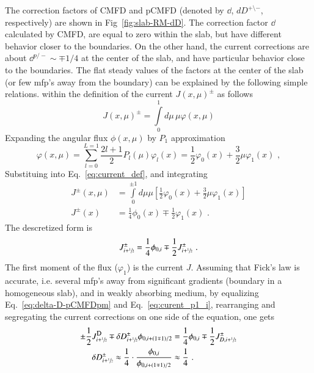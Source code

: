 The correction factors of CMFD and pCMFD (denoted by $\dd$, $dD^{+\setminus -}$, respectively) are shown in Fig~\ref{fig:slab-RM-dD}. The correction factor $\dd$ calculated by CMFD, are equal to zero within the slab, but have different behavior closer to the boundaries. On the other hand, the current corrections are about $\dd^{p/-} \sim \mp 1/4$ at the center of the slab, and have particular behavior close to the boundaries. The flat steady values of the factors at the center of the slab (or few mfp's away from the boundary) can be explained by the following simple relations.  within the definition of the current $J(x,\mu)^\pm$ as follows
\begin{equation}
\label{eq:current_def}
J(x,\mu)^\pm = \int\limits_0^1 d\mu\,\mu\varphi(x,\mu)
\end{equation}
Expanding the angular flux $\phi(x,\mu)$ by $P_1$ approximation
\begin{equation}
\label{eq:p1}
\varphi(x,\mu) = \sum\limits_{l=0}^{L=1}\frac{2l+1}{2}P_l(\mu)\varphi_l(x) = \frac{1}{2}\varphi_0(x) + \frac{3}{2}\mu\varphi_1(x)\,\,,
\end{equation}
Substituing into Eq.~\ref{eq:current_def}, and integrating
\begin{equation}
	\begin{split}
		\label{eq:current_p1}
		J^\pm(x,\mu) &= \int\limits_0^{\pm 1} d\mu\mu\left[\frac{1}{2}\varphi_0(x) + \frac{3}{2}\mu\varphi_1(x)\right] \\
		J^\pm(x) &= \frac{1}{4}\phi_0(x) \mp \frac{1}{2}\varphi_1(x)\,\,.
	\end{split}
\end{equation}
The descretized form is
\begin{equation}
\label{eq:curent_p1_i}
J^\pm_{i+\sfrac{1}{2}} = \frac{1}{4}\phi_{0,i} \mp \frac{1}{2}J^{\pm}_{i+\sfrac{1}{2}}\,\,.
\end{equation}
The first moment of the flux ($\varphi_1$) is the current $J$. Assuming that Fick's law is accurate, i.e. several mfp's away from significant gradients (boundary in a homogeneous slab), and in weakly absorbing medium, 
by equalizing Eq.~\ref{eq:delta-D-pCMFDpm} and Eq.~\ref{eq:curent_p1_i}, rearranging and segregating the current corrections on one side of the equation, one gets
\begin{equation}
	\label{eq:dd_quarter}
	\begin{split}
	\pm \frac{1}{2}\jD_{i+\hzi} \mp \delta D^{\pm} _{i+\hzi} \phi_{0,i+(1\mp 1)/2} & = \frac{1}{4}\phi_{0,i} \mp \frac{1}{2} J^{\pm}_{D,i+\hzi} \\
	\dd^\pm_{i+\hzi} \approx \frac{1}{4}\cdot\frac{\phi_{0,i}}{\phi_{0,i+(1\mp 1)/2}} & \approx \frac{1}{4}\,\,.
	\end{split}
\end{equation}

